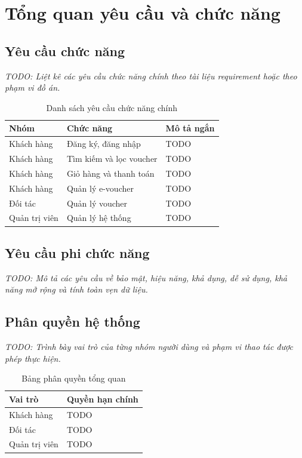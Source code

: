 \section{Tổng quan yêu cầu và chức năng}

\subsection{Yêu cầu chức năng}
\textit{TODO: Liệt kê các yêu cầu chức năng chính theo tài liệu requirement hoặc theo phạm vi đồ án.}

\begin{table}[H]
\centering
\begin{tabular}{p{} p{} p{}}
\toprule
\textbf{Nhóm} & \textbf{Chức năng} & \textbf{Mô tả ngắn} \\
\midrule
Khách hàng & Đăng ký, đăng nhập & TODO \\
Khách hàng & Tìm kiếm và lọc voucher & TODO \\
Khách hàng & Giỏ hàng và thanh toán & TODO \\
Khách hàng & Quản lý e-voucher & TODO \\
Đối tác & Quản lý voucher & TODO \\
Quản trị viên & Quản lý hệ thống & TODO \\
\bottomrule
\end{tabular}
\caption{Danh sách yêu cầu chức năng chính}
\end{table}

\subsection{Yêu cầu phi chức năng}
\textit{TODO: Mô tả các yêu cầu về bảo mật, hiệu năng, khả dụng, dễ sử dụng, khả năng mở rộng và tính toàn vẹn dữ liệu.}

\subsection{Phân quyền hệ thống}
\textit{TODO: Trình bày vai trò của từng nhóm người dùng và phạm vi thao tác được phép thực hiện.}

\begin{table}[H]
\centering
\begin{tabular}{p{} p{}}
\toprule
\textbf{Vai trò} & \textbf{Quyền hạn chính} \\
\midrule
Khách hàng & TODO \\
Đối tác & TODO \\
Quản trị viên & TODO \\
\bottomrule
\end{tabular}
\caption{Bảng phân quyền tổng quan}
\end{table}

